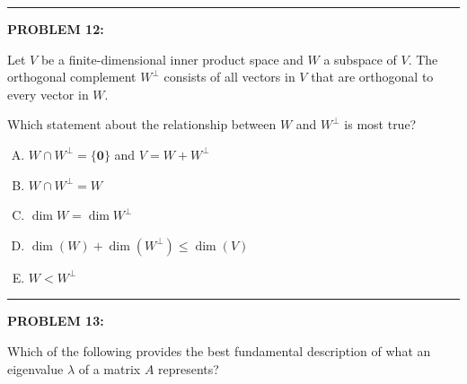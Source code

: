 \documentclass[12pt]{amsart}
\newcommand{\divider}{
  \vspace{-1em} %
  \noindent
  \raisebox{-0.15ex}{\textbullet}%
  \hspace{0.5em}%
  \rule[0.5ex]{0.95\textwidth}{1.0pt}%
  \hspace{0.5em}%
  \raisebox{-0.15ex}{\textbullet}%
  \vspace{0em} %
}
\begin{document}

\divider


{\bf PROBLEM 12:}

Let $V$ be a finite-dimensional inner product space and $W$ a subspace of $V$. The orthogonal complement $W^{\perp}$ consists of all vectors in $V$ that are orthogonal to every vector in $W$.

Which statement about the relationship between $W$ and $W^{\perp}$ is most true?

\begin{enumerate}[(A)]
\item $W \cap W^{\perp} = \{\mathbf{0}\}$ and $V = W + W^{\perp}$
\item $W \cap W^{\perp} = W$
\item $\dim W = \dim W^{\perp}$ 
\item $\dim(W) + \dim(W^{\perp}) \leq \dim(V)$
\item $W<W^{\perp}$
\end{enumerate}


\divider
\newpage

{\bf PROBLEM 13:}

Which of the following provides the best fundamental description of what an eigenvalue $\lambda$ of a matrix $A$ represents?
\end{document}
